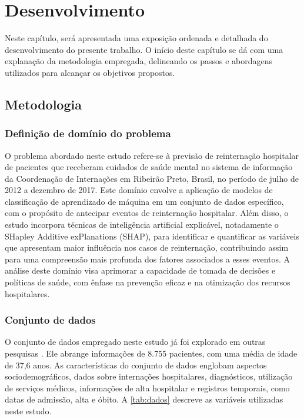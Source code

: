 

\chapter{Desenvolvimento}\label{cap-desenv}

Neste capítulo, será apresentada uma exposição ordenada e detalhada do desenvolvimento do presente trabalho. O início deste capítulo se dá com uma explanação da metodologia empregada, delineando os passos e abordagens utilizados para alcançar os objetivos propostos.

\section{Metodologia}\label{sec-metodologia}

\subsection{Definiç\~ao de domínio do problema}

O problema abordado neste estudo refere-se à previsão de reinternação hospitalar de pacientes que receberam cuidados de saúde mental no sistema de informação da Coordenação de Internações em Ribeirão Preto, Brasil, no período de julho de 2012 a dezembro de 2017. Este domínio envolve a aplicação de modelos de classificação de aprendizado de máquina em um conjunto de dados específico, com o propósito de antecipar eventos de reinternação hospitalar. Além disso, o estudo incorpora técnicas de inteligência artificial explicável, notadamente o SHapley Additive exPlanations (SHAP), para identificar e quantificar as variáveis que apresentam maior influência nos casos de reinternação, contribuindo assim para uma compreensão mais profunda dos fatores associados a esses eventos. A análise deste domínio visa aprimorar a capacidade de tomada de decisões e políticas de saúde, com ênfase na prevenção eficaz e na otimização dos recursos hospitalares.

\subsection{Conjunto de dados}

O conjunto de dados empregado neste estudo já foi explorado em outras pesquisas \cite{barros2016, eHealth, FeatureSensitivity}. Ele abrange informações de 8.755 pacientes, com uma média de idade de 37,6 anos. As características do conjunto de dados englobam aspectos sociodemográficos, dados sobre internações hospitalares, diagnósticos, utilização de serviços médicos, informações de alta hospitalar e registros temporais, como datas de admissão, alta e óbito. A \autoref{tab:dados} descreve as variáveis utilizadas neste estudo.

